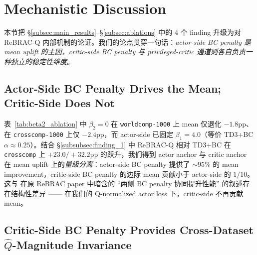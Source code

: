 %
%
%

\section{Mechanistic Discussion}\label{sec:discussion}

本节把 \S\ref{subsec:main_results}--\S\ref{subsec:ablations} 中的 4 个 finding 升级为对 ReBRAC-Q 内部机制的论证。我们的论点贯穿一句话：\emph{actor-side BC penalty 是 mean uplift 的主因，critic-side BC penalty 与 privileged-critic 通道则各自负责一种独立的稳定性维度}。

\subsection{Actor-Side BC Penalty Drives the Mean; Critic-Side Does Not}\label{subsec:discussion_actor_drives_mean}

表~\ref{tab:beta2_ablation} 中 $\beta_2 = 0$ 在 \texttt{worldcomp-1000} 上 mean 仅退化 $-1.8$pp、在 \texttt{crosscomp-1000} 上仅 $-2.4$pp，而 actor-side 已固定 $\beta_1 = 4.0$（等价 TD3+BC $\alpha \approx 0.25$）。结合 \S\ref{subsubsec:finding_1} 中 ReBRAC-Q 相对 TD3+BC 在 \texttt{crosscomp} 上 $+23.0/+32.2$pp 的跃升，我们得到 actor anchor 与 critic anchor 在 mean uplift 上的\emph{量级分离}：actor-side BC penalty 提供了 $\sim 95\%$ 的 mean improvement，critic-side BC penalty 的边际 mean 贡献小于 actor-side 的 $1/10$。这与 \citet{tarasov2023rebrac} 在原 ReBRAC paper 中暗含的 ``两侧 BC penalty 协同提升性能'' 的叙述存在结构性差异 —— 在我们的 Q-normalized actor loss 下，critic-side 不再贡献 mean。

\subsection{Critic-Side BC Penalty Provides Cross-Dataset $\hat{Q}$-Magnitude Invariance}\label{subsec:discussion_critic_q_invariance}


